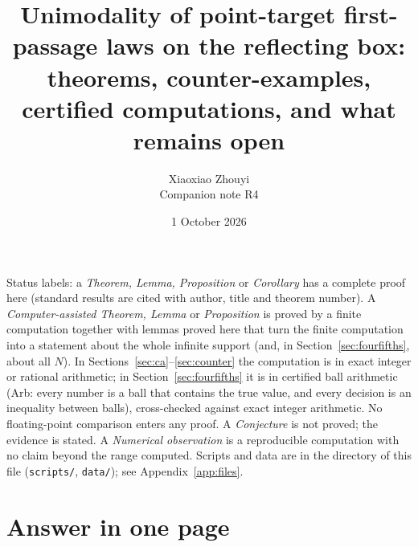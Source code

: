 \documentclass[11pt,a4paper]{article}
\title{Unimodality of point-target first-passage laws on the reflecting box:\\
theorems, counter-examples, certified computations, and what remains open}
\author{Xiaoxiao Zhouyi\\[2pt]\normalsize Companion note R4}
\date{1 October 2026}
\theoremstyle{definition}
\begin{document}
\setlength{\emergencystretch}{3em}
\sloppy
\maketitle
\medskip{}\par\medskip


\noindent
Status labels: a \emph{Theorem, Lemma, Proposition} or \emph{Corollary} has a complete proof here (standard results are cited with author, title and theorem number). A \emph{Computer-assisted Theorem, Lemma} or \emph{Proposition} is proved by a finite computation together with lemmas proved here that turn the finite computation into a statement about the whole infinite support (and, in Section~\ref{sec:fourfifths}, about all $N$). In Sections~\ref{sec:ca}--\ref{sec:counter} the computation is in exact integer or rational arithmetic; in Section~\ref{sec:fourfifths} it is in certified ball arithmetic (Arb: every number is a ball that contains the true value, and every decision is an inequality between balls), cross-checked against exact integer arithmetic. No floating-point comparison enters any proof. A \emph{Conjecture} is not proved; the evidence is stated. A \emph{Numerical observation} is a reproducible computation with no claim beyond the range computed. Scripts and data are in the directory of this file (\texttt{scripts/}, \texttt{data/}); see Appendix~\ref{app:files}.

\section*{Answer in one page}
\end{document}
